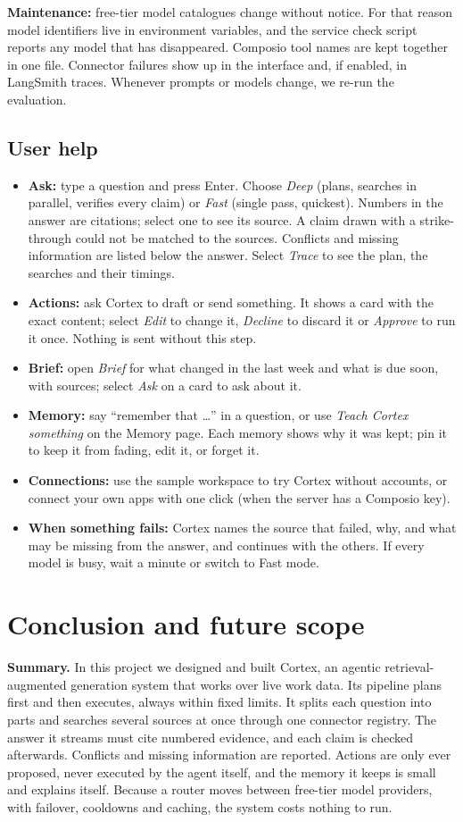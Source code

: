 \documentclass[oneside,a4paper,12pt]{report}
\begin{document}
\textbf{Maintenance:} free-tier model catalogues change without notice. For that reason model identifiers live in environment variables, and the service check script reports any model that has disappeared. Composio tool names are kept together in one file. Connector failures show up in the interface and, if enabled, in LangSmith traces. Whenever prompts or models change, we re-run the evaluation.
     \section{User help}
\begin{itemize}
\item \textbf{Ask:} type a question and press Enter. Choose \emph{Deep} (plans, searches in parallel, verifies every claim) or \emph{Fast} (single pass, quickest). Numbers in the answer are citations; select one to see its source. A claim drawn with a strike-through could not be matched to the sources. Conflicts and missing information are listed below the answer. Select \emph{Trace} to see the plan, the searches and their timings.
\item \textbf{Actions:} ask Cortex to draft or send something. It shows a card with the exact content; select \emph{Edit} to change it, \emph{Decline} to discard it or \emph{Approve} to run it once. Nothing is sent without this step.
\item \textbf{Brief:} open \emph{Brief} for what changed in the last week and what is due soon, with sources; select \emph{Ask} on a card to ask about it.
\item \textbf{Memory:} say ``remember that \ldots'' in a question, or use \emph{Teach Cortex something} on the Memory page. Each memory shows why it was kept; pin it to keep it from fading, edit it, or forget it.
\item \textbf{Connections:} use the sample workspace to try Cortex without accounts, or connect your own apps with one click (when the server has a Composio key).
\item \textbf{When something fails:} Cortex names the source that failed, why, and what may be missing from the answer, and continues with the others. If every model is busy, wait a minute or switch to Fast mode.
\end{itemize}

 \chapter{Conclusion and future scope}
\textbf{Summary.} In this project we designed and built Cortex, an agentic retrieval-augmented generation system that works over live work data. Its pipeline plans first and then executes, always within fixed limits. It splits each question into parts and searches several sources at once through one connector registry. The answer it streams must cite numbered evidence, and each claim is checked afterwards. Conflicts and missing information are reported. Actions are only ever proposed, never executed by the agent itself, and the memory it keeps is small and explains itself. Because a router moves between free-tier model providers, with failover, cooldowns and caching, the system costs nothing to run.
\end{document}
